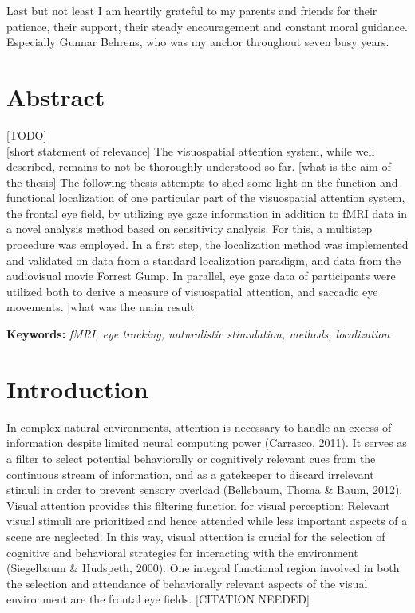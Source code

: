 \documentclass[a4paper, 11pt]{scrreprt}
\begin{document}
\bigskip

Last but not least I am heartily grateful to my parents and friends for their patience, their support, their steady encouragement and constant moral guidance. Especially Gunnar Behrens, who was my anchor throughout seven busy years.


\clearpage

\setcounter{page}{1}	%


\chapter*{Abstract}

[TODO] \\

[short statement of relevance]
The visuospatial attention system, while well described, remains to not be thoroughly understood so far. 
[what is the aim of the thesis]
The following thesis attempts to shed some light on the function and functional localization of one particular part of the visuospatial attention system, the frontal eye field, by utilizing eye gaze information in addition to fMRI data in a novel analysis method based on sensitivity analysis. 
For this, a multistep procedure was employed. 
In a first step, the localization method was implemented and validated on data from a standard localization paradigm, and data from the audiovisual movie Forrest Gump.
In parallel, eye gaze data of participants were utilized both to derive a measure of visuospatial attention, and saccadic eye movements.
[what was the main result]

\bigskip

\textbf{Keywords:} \textit{fMRI, eye tracking, naturalistic stimulation, methods, localization}



\chapter{Introduction}

In complex natural environments, attention is necessary to handle an excess of information despite limited neural computing power (Carrasco, 2011). It serves as a filter to select potential behaviorally or cognitively relevant cues from the continuous stream of information, and as a gatekeeper to discard irrelevant stimuli in order to prevent sensory overload (Bellebaum, Thoma \& Baum, 2012). Visual attention provides this filtering function for visual perception: Relevant visual stimuli are prioritized and hence attended while less important aspects of a scene are neglected. In this way, visual attention is crucial for the selection of cognitive and behavioral strategies for interacting with the environment (Siegelbaum \& Hudspeth, 2000).
\newline
One integral functional region involved in both the selection and attendance of behaviorally relevant aspects of the visual environment are the frontal eye fields. [CITATION NEEDED]
\end{document}
